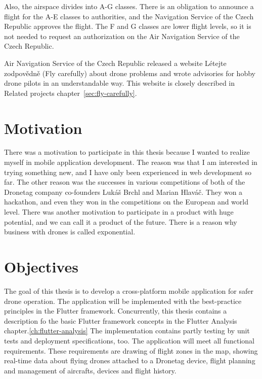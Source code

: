 Also, the airspace divides into A-G classes.\cite{airspace}
There is an obligation to announce a flight for the A-E classes to authorities, and the Navigation Service of the Czech Republic approves the flight.
The F and G classes are lower flight levels, so it is not needed to request an authorization on the Air Navigation Service of the Czech Republic.

Air Navigation Service of the Czech Republic released a website L{\' e}tejte zodpov{\v e}dn{\v e} (Fly carefully) about drone problems and wrote advisories for hobby drone pilots in an understandable way.
This website is closely described in Related projects chapter~\ref{sec:fly-carefully}.


\section{Motivation}\label{sec:motivation}
There was a motivation to participate in this thesis because I wanted to realize myself in mobile application development.
The reason was that I am interested in trying something new, and I have only been experienced in web development so far.
The other reason was the successes in various competitions of both of the Dronetag company co-founders Luk{\' a}{\v s} Brchl and Marian Hlav{\' a}{\v c}.
They won a hackathon, and even they won in the competitions on the European and world level.
There was another motivation to participate in a product with huge potential, and we can call it a product of the future.
There is a reason why business with drones is called exponential.


\section{Objectives}\label{sec:objectives}
The goal of this thesis is to develop a cross-platform mobile application for safer drone operation.
The application will be implemented with the best-practice principles in the Flutter framework.
Concurrently, this thesis contains a description fo the basic Flutter framework concepts in the Flutter Analysis chapter.\ref{ch:flutter-analysis}
The implementation contains partly testing by unit tests and deployment specifications, too.
The application will meet all functional requirements.
These requirements are drawing of flight zones in the map, showing real-time data about flying drones attached to a Dronetag device, flight planning and management of aircrafts, devices and flight history.

